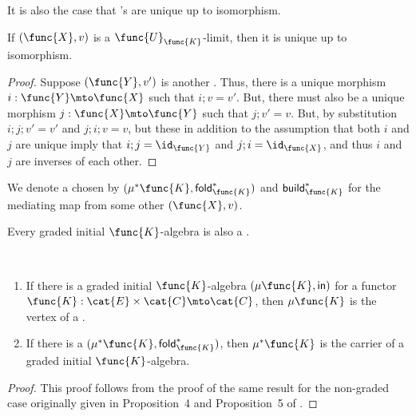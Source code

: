 \noindent
It is also the case that 's are unique up to isomorphism.
% 
\begin{lemma}
\label{lemma:forgetful_limits_are_unique}
    If $(\func{X},v)$ is a $\func{U}_{\func{K}}$-limit, then it is
    unique up to isomorphism.
\end{lemma}
\begin{proof}
    Suppose $(\func{Y},v')$ is another . Thus, there is a
    unique  morphism $i : \func{Y} \mto \func{X}$ such that
    $i;v = v'$. But, there must also be a unique  morphism $j
    : \func{X} \mto \func{Y}$ such that $j;v' = v$.  But, by
    substitution $i;j;v' = v'$ and $j;i;v = v$, but these in addition
    to the assumption that both $i$ and $j$ are unique imply that $i;j
    = \id_\func{Y}$ and $j;i = \id_\func{X}$, and thus $i$ and $j$ are
    inverses of each other. 
\end{proof}
% 
\noindent
We denote a chosen  by
$(\mu^*\func{K},\mathsf{fold}^*_\func{K})$ and
$\mathsf{build}^*_\func{K}$ for the mediating map from some other
 $(\func{X},v)$.

Every graded initial $\func{K}$-algebra is also a .
% 
\begin{lemma}
\label{lemma:initial_algebras_are_also_limits}
\,\\[-15pt]
\begin{enumerate}[label=\roman*.]
\item If there is a graded initial $\func{K}$-algebra
    $(\mu\func{K},\mathsf{in})$ for a functor $\func{K} : \cat{E}
    \times \cat{C} \mto \cat{C}$, then $\mu\func{K}$ is the vertex of
    a .
\item If there is a 
$(\mu^*\func{K},\mathsf{fold}^*_\func{K})$, then $\mu^*\func{K}$
is the carrier of a graded initial $\func{K}$-algebra.
\end{enumerate}
\end{lemma}
\begin{proof}
This proof follows from the proof of the same result for the
non-graded case originally given in Proposition~4 and Proposition~5 of
\cite{Ghani:2004}.
\end{proof}


